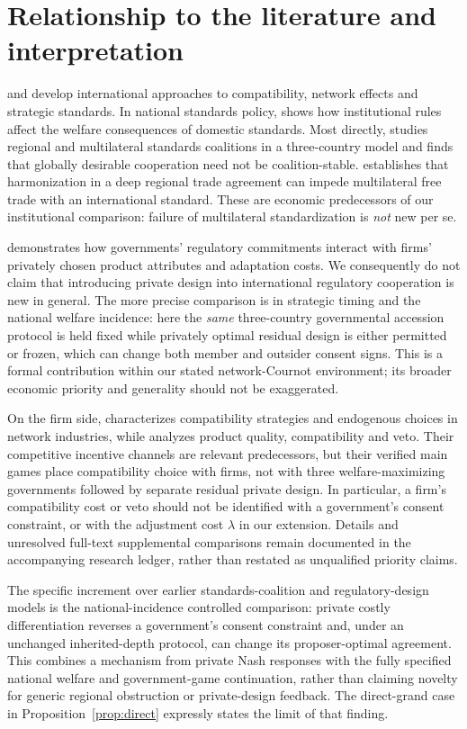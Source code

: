 \documentclass[11pt,a4paper]{article}
\theoremstyle{remark}\newtheorem{remark}[theorem]{Remark}
\begin{document}
\section{Relationship to the literature and interpretation}\label{sec:literature}
\citet{GandalShy2001} and \citet{Klimenko2009} develop international approaches to compatibility, network effects and strategic standards. In national standards policy, \citet{Costinot2008} shows how institutional rules affect the welfare consequences of domestic standards. Most directly, \citet{Takarada2020} studies regional and multilateral standards coalitions in a three-country model and finds that globally desirable cooperation need not be coalition-stable. \citet{Kawabata2021} establishes that harmonization in a deep regional trade agreement can impede multilateral free trade with an international standard. These are economic predecessors of our institutional comparison: failure of multilateral standardization is \emph{not} new per se.

\citet{Grossman2021} demonstrates how governments' regulatory commitments interact with firms' privately chosen product attributes and adaptation costs. We consequently do not claim that introducing private design into international regulatory cooperation is new in general. The more precise comparison is in strategic timing and the national welfare incidence: here the \emph{same} three-country governmental accession protocol is held fixed while privately optimal residual design is either permitted or frozen, which can change both member and outsider consent signs. This is a formal contribution within our stated network-Cournot environment; its broader economic priority and generality should not be exaggerated.

On the firm side, \citet{Buccella2023} characterizes compatibility strategies and endogenous choices in network industries, while \citet{Cheng2025} analyzes product quality, compatibility and veto. Their competitive incentive channels are relevant predecessors, but their verified main games place compatibility choice with firms, not with three welfare-maximizing governments followed by separate residual private design. In particular, a firm's compatibility cost or veto should not be identified with a government's consent constraint, or with the adjustment cost $\lambda$ in our extension. Details and unresolved full-text supplemental comparisons remain documented in the accompanying research ledger, rather than restated as unqualified priority claims.

The specific increment over earlier standards-coalition and regulatory-design models is the national-incidence controlled comparison: private costly differentiation reverses a government's consent constraint and, under an unchanged inherited-depth protocol, can change its proposer-optimal agreement. This combines a mechanism from private Nash responses with the fully specified national welfare and government-game continuation, rather than claiming novelty for generic regional obstruction or private-design feedback. The direct-grand case in Proposition~\ref{prop:direct} expressly states the limit of that finding.
\end{document}
